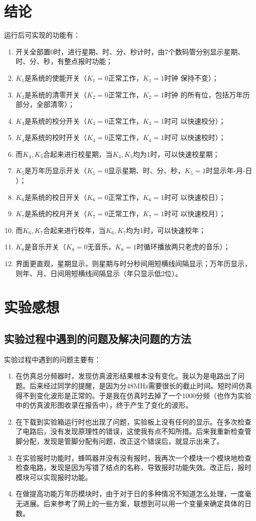 \documentclass[12pt]{article}
\begin{document}
\section{ 结论}
运行后可实现的功能有：
\begin{enumerate}[1、]
\item 开关全部置0时，进行星期、时、分、秒计时，由7个数码管分别显示星期、时、分、秒，有整点报时功能；
\item $K_1$是系统的使能开关（$K_1=0$正常工作，$K_1=1$时钟
保持不变）；
\item $K_2$是系统的清零开关（$K_2=0$正常工作，$K_2=1$时钟
的所有位，包括万年历部分，全部清零）；
\item $K_3$是系统的校分开关（$K_3=0$正常工作，$K_3=1$时可
以快速校分）；
\item $K_4$是系统的校时开关（$K_4=0$正常工作，$K_4=1$时可
以快速校时）；
\item 而$K_4,K_5$合起来进行校星期，当$K_4,K_5$均为1时，可以快速校星期；
\item $K_5$是万年历显示开关（$K_5=0$显示星期、时、分、秒，$K_5=1$时显示年-月-日 ）；
\item $K_6$是系统的校日开关（$K_6=0$正常工作，$K_6=1$时可
以快速校日）；
\item $K_7$是系统的校月开关（$K_7=0$正常工作，$K_7=1$时可
以快速校月）；
\item 而$K_6,K_7$合起来进行校年，当$K_6,K_7$均为1时，可以快速校年；
\item $K_8$是音乐开关（$K_8=0$无音乐，$K_8=1$时循环播放两只老虎的音乐）；
\item  界面更直观，星期显示，则星期与时分秒间用短横线间隔显示；万年历显示，则年、月、日间用短横线间隔显示（年只显示低2位）。
\end{enumerate}
\section{实验感想}
\subsection{实验过程中遇到的问题及解决问题的方法}
实验过程中遇到的问题主要有：
\begin{enumerate}[1、]
\item 在仿真总分频器时，发现仿真波形结果根本没有变化。我以为是电路出了问题。后来经过同学的提醒，是因为分48MHz需要很长的截止时间。短时间仿真得不到变化波形是正常的。于是我在仿真时去掉了一个1000分频（也作为实验中的仿真波形图收录在报告中），终于产生了变化的波形。
\item 在下载到实验箱运行时也出现了问题，实验板上没有任何的显示。在多次检查了电路后，没有发现原理性的错误，这使我有点不知所措。后来我重新检查管脚分配，发现是管脚分配有问题，改正这个错误后，就显示出来了。
\item 在实验报时功能时，蜂鸣器并没有没有报时，我再次一个模块一个模块地检查检查电路，发现是因为写错了结点的名称，导致报时功能失效。改正后，报时模块可以实现报时功能。
\item 在做提高功能万年历模块时，由于对于日的多种情况不知道怎么处理，一度毫无进展。后来参考了网上的一些方案，联想到可以用一个变量来确定具体的日数。
\end{enumerate}
\end{document}
